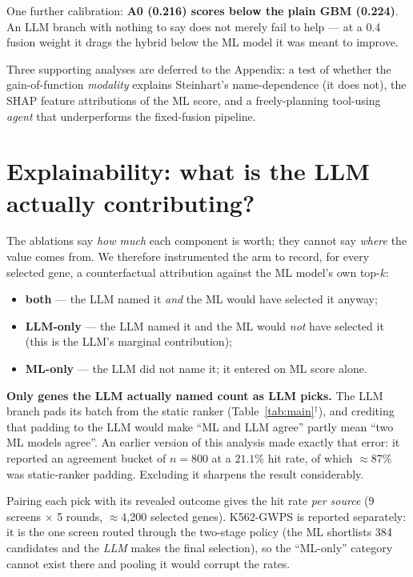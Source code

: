 \documentclass[11pt]{article}
\begin{document}
One further calibration: \textbf{A0 (0.216) scores below the plain GBM (0.224)}. An LLM branch with
nothing to say does not merely fail to help --- at a 0.4 fusion weight it drags the hybrid below the
ML model it was meant to improve.


\noindent Three supporting analyses are deferred to the Appendix: a test of whether the gain-of-function \emph{modality} explains Steinhart's name-dependence (it does not), the SHAP feature attributions of the ML score, and a freely-planning tool-using \emph{agent} that underperforms the fixed-fusion pipeline.

\section*{Explainability: what is the LLM actually contributing?}

The ablations say \emph{how much} each component is worth; they cannot say \emph{where} the value
comes from. We therefore instrumented the arm to record, for every selected gene, a counterfactual
attribution against the ML model's own top-$k$:

\begin{itemize}\itemsep2pt
  \item \textbf{both} --- the LLM named it \emph{and} the ML would have selected it anyway;
  \item \textbf{LLM-only} --- the LLM named it and the ML would \emph{not} have selected it
        (this is the LLM's marginal contribution);
  \item \textbf{ML-only} --- the LLM did not name it; it entered on ML score alone.
\end{itemize}

\noindent
\textbf{Only genes the LLM actually named count as LLM picks.} The LLM branch pads its batch from the
static ranker (Table~\ref{tab:main}$^\dagger$), and crediting that padding to the LLM would make
``ML and LLM agree'' partly mean ``two ML models agree''. An earlier version of this analysis made
exactly that error: it reported an agreement bucket of $n=800$ at a $21.1\%$ hit rate, of which
$\approx$87\% was static-ranker padding. Excluding it sharpens the result considerably.

Pairing each pick with its revealed outcome gives the hit rate \emph{per source}
(9 screens $\times$ 5 rounds, $\approx$4{,}200 selected genes).
K562-GWPS is reported separately: it is the one screen routed through the two-stage policy
(the ML shortlists 384 candidates and the \emph{LLM} makes the final selection), so the
``ML-only'' category cannot exist there and pooling it would corrupt the rates.
\end{document}

